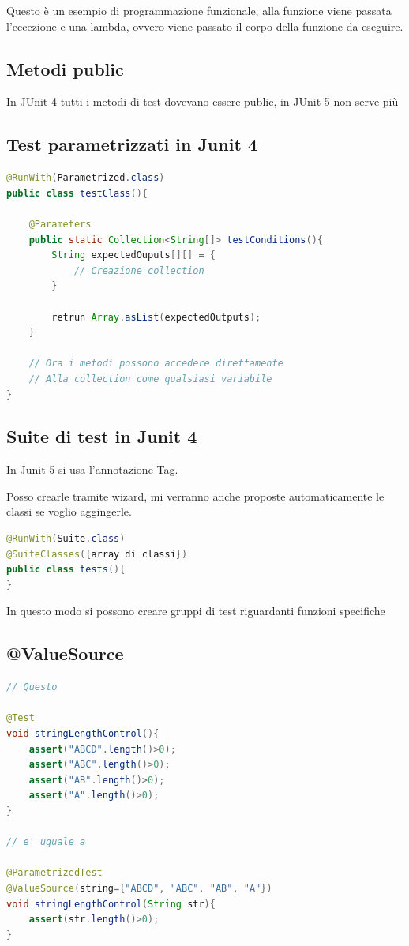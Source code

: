 \documentclass[11pt,a4paper]{book}
\begin{document}
Questo è un esempio di programmazione funzionale, alla funzione viene passata l'eccezione e una lambda, ovvero viene passato il corpo della funzione da eseguire.

\subsection{Metodi public}
In JUnit 4 tutti i metodi di test dovevano essere public, in JUnit 5 non serve più

\subsection{Test parametrizzati in Junit 4}
\begin{lstlisting}[language = Java]
@RunWith(Parametrized.class)
public class testClass(){

	@Parameters
	public static Collection<String[]> testConditions(){
		String expectedOuputs[][] = {
			// Creazione collection
		}
		
		retrun Array.asList(expectedOutputs);
	}

	// Ora i metodi possono accedere direttamente
	// Alla collection come qualsiasi variabile
}
\end{lstlisting}


\subsection{Suite di test in Junit 4}
In Junit 5 si usa l'annotazione Tag.

Posso crearle tramite wizard, mi verranno anche proposte automaticamente le classi se voglio aggingerle. 
\begin{lstlisting}[language = Java]
@RunWith(Suite.class)
@SuiteClasses({array di classi})
public class tests(){
}
\end{lstlisting}

In questo modo si possono creare gruppi di test riguardanti funzioni specifiche
\subsection{@ValueSource}
\begin{lstlisting}[language = Java]
// Questo

@Test
void stringLengthControl(){
	assert("ABCD".length()>0);
	assert("ABC".length()>0);
	assert("AB".length()>0);
	assert("A".length()>0);
}

// e' uguale a

@ParametrizedTest
@ValueSource(string={"ABCD", "ABC", "AB", "A"})
void stringLengthControl(String str){
	assert(str.length()>0);
}
\end{lstlisting}
\end{document}
